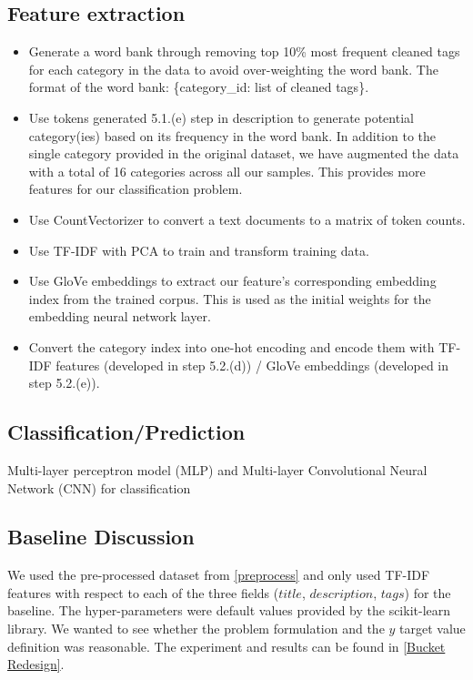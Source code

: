 \documentclass[english]{article}
\begin{document}
\begin{enumerate}
    \subsection{Feature extraction}
    \begin{itemize}
    \item Generate a word bank through removing top 10\% most frequent cleaned tags for each category in the data to avoid over-weighting the word bank. The format of the word bank: 
    \{category\_id: list of cleaned tags\}.
    \item Use tokens generated 5.1.(e) step in description to generate potential category(ies) based on its frequency in the word bank. In addition to the single category provided in the original dataset, we have augmented the data with a total of 16 categories across all our samples. This provides more features for our classification problem.
    \item Use CountVectorizer to convert a text documents to a matrix of token counts.
    \item Use TF-IDF with PCA to train and transform training data.
    \item Use GloVe embeddings to extract our feature's corresponding embedding index from the trained corpus. This is used as the initial weights for the embedding neural network layer. 
    \item Convert the category index into one-hot encoding and encode them with TF-IDF features (developed in step 5.2.(d)) / GloVe embeddings (developed in step 5.2.(e)).
    \end{itemize}
    
    \subsection{Classification/Prediction}
    Multi-layer perceptron model (MLP) and Multi-layer Convolutional Neural Network (CNN) for classification

    
    \subsection{Baseline Discussion}
    We used the pre-processed dataset from \ref{preprocess} and only used TF-IDF features with respect to each of the three fields ($title$, $description$, $tags$) for the baseline. The hyper-parameters were default values provided by the scikit-learn library. We wanted to see whether the problem formulation and the $y$ target value definition was reasonable. The experiment and results can be found in \ref{Bucket Redesign}.

\end{enumerate}
\end{document}
